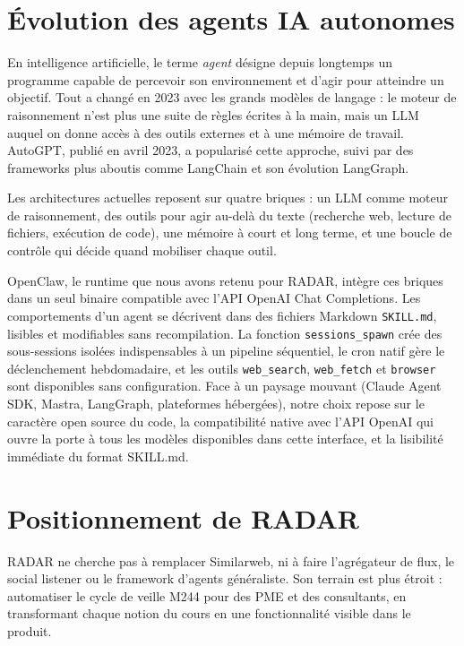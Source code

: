 \documentclass[12pt,a4paper,openany]{report}
\begin{document}
\section{Évolution des agents IA autonomes}
\label{sec:agents-ia}

En intelligence artificielle, le terme \textit{agent} désigne depuis longtemps un programme capable de percevoir son environnement et d'agir pour atteindre un objectif. Tout a changé en 2023 avec les grands modèles de langage : le moteur de raisonnement n'est plus une suite de règles écrites à la main, mais un LLM auquel on donne accès à des outils externes et à une mémoire de travail. AutoGPT, publié en avril 2023, a popularisé cette approche, suivi par des frameworks plus aboutis comme LangChain et son évolution LangGraph.

Les architectures actuelles reposent sur quatre briques : un LLM comme moteur de raisonnement, des outils pour agir au-delà du texte (recherche web, lecture de fichiers, exécution de code), une mémoire à court et long terme, et une boucle de contrôle qui décide quand mobiliser chaque outil.

OpenClaw, le runtime que nous avons retenu pour RADAR, intègre ces briques dans un seul binaire compatible avec l'API OpenAI Chat Completions. Les comportements d'un agent se décrivent dans des fichiers Markdown \texttt{SKILL.md}, lisibles et modifiables sans recompilation. La fonction \texttt{sessions\_spawn} crée des sous-sessions isolées indispensables à un pipeline séquentiel, le cron natif gère le déclenchement hebdomadaire, et les outils \texttt{web\_search}, \texttt{web\_fetch} et \texttt{browser} sont disponibles sans configuration. Face à un paysage mouvant (Claude Agent SDK, Mastra, LangGraph, plateformes hébergées), notre choix repose sur le caractère open source du code, la compatibilité native avec l'API OpenAI qui ouvre la porte à tous les modèles disponibles dans cette interface, et la lisibilité immédiate du format SKILL.md.

\section{Positionnement de RADAR}
\label{sec:positionnement-radar}

RADAR ne cherche pas à remplacer Similarweb, ni à faire l'agrégateur de flux, le social listener ou le framework d'agents généraliste. Son terrain est plus étroit : automatiser le cycle de veille M244 pour des PME et des consultants, en transformant chaque notion du cours en une fonctionnalité visible dans le produit.
\end{document}
